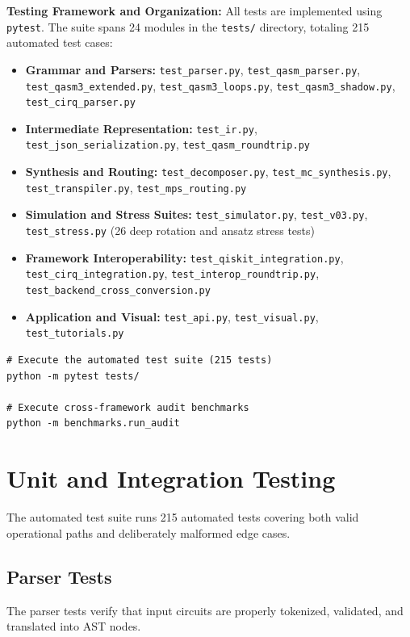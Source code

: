 \textbf{Testing Framework and Organization:}
All tests are implemented using \texttt{pytest}. The suite spans 24 modules in the \texttt{tests/} directory, totaling 215 automated test cases:
\begin{itemize}[leftmargin=*]
    \item \textbf{Grammar and Parsers:} \texttt{test\_parser.py}, \texttt{test\_qasm\_parser.py}, \texttt{test\_qasm3\_extended.py}, \texttt{test\_qasm3\_loops.py}, \texttt{test\_qasm3\_shadow.py}, \texttt{test\_cirq\_parser.py}
    \item \textbf{Intermediate Representation:} \texttt{test\_ir.py}, \texttt{test\_json\_serialization.py}, \texttt{test\_qasm\_roundtrip.py}
    \item \textbf{Synthesis and Routing:} \texttt{test\_decomposer.py}, \texttt{test\_mc\_synthesis.py}, \texttt{test\_transpiler.py}, \texttt{test\_mps\_routing.py}
    \item \textbf{Simulation and Stress Suites:} \texttt{test\_simulator.py}, \texttt{test\_v03.py}, \texttt{test\_stress.py} (26 deep rotation and ansatz stress tests)
    \item \textbf{Framework Interoperability:} \texttt{test\_qiskit\_integration.py}, \texttt{test\_cirq\_integration.py}, \texttt{test\_interop\_roundtrip.py}, \texttt{test\_backend\_cross\_conversion.py}
    \item \textbf{Application and Visual:} \texttt{test\_api.py}, \texttt{test\_visual.py}, \texttt{test\_tutorials.py}
\end{itemize}

\begin{verbatim}
# Execute the automated test suite (215 tests)
python -m pytest tests/

# Execute cross-framework audit benchmarks
python -m benchmarks.run_audit
\end{verbatim}

\section{Unit and Integration Testing}
The automated test suite runs 215 automated tests covering both valid operational paths and deliberately malformed edge cases.

\subsection{Parser Tests}
The parser tests verify that input circuits are properly tokenized, validated, and translated into AST nodes.

